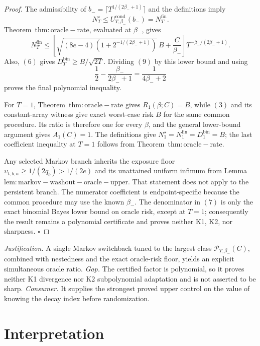 \documentclass{article}
\begin{document}
\begin{proof}
The admissibility of \(b_-=\lceil T^{1/(2\beta_-+1)}\rceil\) and the definitions imply
\[
N_T^\star\le U_{T,\beta_-}^{\mathrm{cond}}(b_-)=N_T^{\mathrm{fin}}.
\tag{8}
\]
Theorem~\(\mathrm{thm:oracle-rate}\), evaluated at \(\beta_-\), gives
\[
N_T^{\mathrm{fin}}
\le\left[\sqrt{(8e-4)\left(1+2^{-1/(2\beta_-+1)}\right)}\,B+\frac C{\beta_-}\right]T^{-\beta_-/(2\beta_-+1)}.
\tag{9}
\]
Also, \((6)\) gives \(D_T^{\mathrm{bin}}\ge B/\sqrt{2T}\). Dividing \((9)\) by this lower bound and using
\[
\frac12-\frac{\beta_-}{2\beta_-+1}=\frac1{4\beta_-+2}
\]
proves the final polynomial inequality.

For \(T=1\), Theorem~\(\mathrm{thm:oracle-rate}\) gives \(R_1(\beta;C)=B\), while \((3)\) and its constant-array witness give exact worst-case risk \(B\) for the same common procedure. Its ratio is therefore one for every \(\beta\), and the general lower-bound argument gives \(A_1(C)=1\). The definitions give \(N_1^\star=N_1^{\mathrm{fin}}=D_1^{\mathrm{bin}}=B\); the last coefficient inequality at \(T=1\) follows from Theorem~\(\mathrm{thm:oracle-rate}\).

Any selected Markov branch inherits the exposure floor \(\upsilon_{t,b,a}\ge1/(2q_b)>1/(2e)\) and its unattained uniform infimum from Lemma~\(\mathrm{lem:markov-washout-oracle-upper}\). That statement does not apply to the persistent branch. The numerator coefficient is endpoint-specific because the common procedure may use the known \(\beta_-\). The denominator in \((7)\) is only the exact binomial Bayes lower bound on oracle risk, except at \(T=1\); consequently the result remains a polynomial certificate and proves neither K1, K2, nor sharpness. \(\square\)
\end{proof}
\par\smallskip\noindent \textit{Justification.} A single Markov switchback tuned to the largest class \(\mathcal P_{T,\beta_-}(C)\), combined with nestedness and the exact oracle-risk floor, yields an explicit simultaneous oracle ratio. \textit{Gap.} The certified factor is polynomial, so it proves neither K1 divergence nor K2 subpolynomial adaptation and is not asserted to be sharp. \textit{Consumer.} It supplies the strongest proved upper control on the value of knowing the decay index before randomization.

\section{Interpretation}
\end{document}
